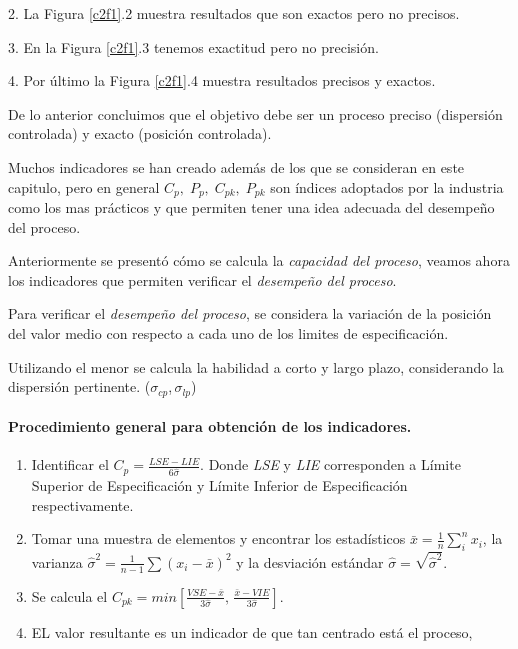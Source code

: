 \documentclass[spanish]{report}
\begin{document}
2. La Figura \ref{c2f1}.2 muestra resultados que son exactos pero no precisos.

3. En la Figura \ref{c2f1}.3 tenemos exactitud pero no precisión.

4. Por último la Figura \ref{c2f1}.4 muestra resultados precisos y exactos.

De lo anterior concluimos que el objetivo debe ser un proceso preciso (dispersión controlada) y exacto (posición controlada).

Muchos indicadores se han creado además de los que se consideran en
este capitulo, pero en general $C_{p},\;P_{p},\;C_{pk},\;P_{pk}$
son índices adoptados por la industria como los mas prácticos y que
permiten tener una idea adecuada del desempeño del proceso.

Anteriormente se presentó cómo se calcula la \emph{capacidad del proceso},
veamos ahora los indicadores que permiten verificar el \emph{desempeño
del proceso}.

Para verificar el \emph{desempeño del proceso}, se considera la variación
de la posición del valor medio con respecto a cada uno de los
limites de especificación.

Utilizando el menor se calcula la habilidad a corto y largo plazo, considerando la dispersión
pertinente. ($\sigma_{cp}$,\,$\sigma_{lp}$)


\paragraph{\textmd{Procedimiento general para obtención de los indicadores.}}

\begin{enumerate}
\item Identificar el $C_{p}=\frac{LSE-LIE}{6\hat{\sigma}}$. Donde \emph{LSE}
y \emph{LIE} corresponden a Límite Superior de Especificación y Límite
Inferior de Especificación respectivamente.
\item Tomar una muestra de elementos y encontrar los estadísticos $\bar{x}=\frac{1}{n}\sum_{i}^{n}x_{i}$,
la varianza $\hat{\sigma}^{2}=\frac{1}{n-1}\sum(x_{i}-\bar{x})^{2}$ y la desviación
estándar $\hat{\sigma}=\sqrt{\hat{\sigma}^{2}}$.
\item Se calcula el $C_{pk}=min\left[\frac{VSE-\bar{x}}{3\hat{\sigma}},\,\frac{\bar{x}-VIE}{3\hat{\sigma}}\right]$.
\item EL valor resultante es un indicador de que tan centrado está el proceso,
\end{enumerate}
\end{document}
